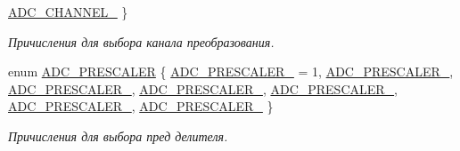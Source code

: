 \begin{DoxyCompactItemize}
\mbox{\hyperlink{group___a_d_c_ggaecdfe48b0bc36d2dd1f99274613a6c92ad6ef86ca1b448f220905d771f258586a}{A\+D\+C\+\_\+\+C\+H\+A\+N\+N\+E\+L\+\_}}
 \}
\begin{DoxyCompactList}\small\item\em Причисления для выбора канала преобразования. \end{DoxyCompactList}\item 
enum \mbox{\hyperlink{group___a_d_c_gaed8f948440ecdc58f0e7139db60e8e8e}{A\+D\+C\+\_\+\+P\+R\+E\+S\+C\+A\+L\+ER}} \{ \newline
\mbox{\hyperlink{group___a_d_c_ggaed8f948440ecdc58f0e7139db60e8e8ea48252a906c632fcb42242633ffe6a40a}{A\+D\+C\+\_\+\+P\+R\+E\+S\+C\+A\+L\+E\+R\+\_}} = 1, 
\mbox{\hyperlink{group___a_d_c_ggaed8f948440ecdc58f0e7139db60e8e8ea9748302262a80c1cdb3bd245535fb3a1}{A\+D\+C\+\_\+\+P\+R\+E\+S\+C\+A\+L\+E\+R\+\_}}, 
\mbox{\hyperlink{group___a_d_c_ggaed8f948440ecdc58f0e7139db60e8e8eae14acc5684c99eb21c9812b2166071b3}{A\+D\+C\+\_\+\+P\+R\+E\+S\+C\+A\+L\+E\+R\+\_}}, 
\mbox{\hyperlink{group___a_d_c_ggaed8f948440ecdc58f0e7139db60e8e8ea8f37b7469c09fd96dde8aac7d5e6b92a}{A\+D\+C\+\_\+\+P\+R\+E\+S\+C\+A\+L\+E\+R\+\_}}, 
\newline
\mbox{\hyperlink{group___a_d_c_ggaed8f948440ecdc58f0e7139db60e8e8ea2b3edc83722c3d3763b2bba0b26aa867}{A\+D\+C\+\_\+\+P\+R\+E\+S\+C\+A\+L\+E\+R\+\_}}, 
\mbox{\hyperlink{group___a_d_c_ggaed8f948440ecdc58f0e7139db60e8e8ea090eaf9d6262f32bfd23214b4e180216}{A\+D\+C\+\_\+\+P\+R\+E\+S\+C\+A\+L\+E\+R\+\_}}, 
\mbox{\hyperlink{group___a_d_c_ggaed8f948440ecdc58f0e7139db60e8e8ea69cfa0fc0ce969c362d2846a1ec38913}{A\+D\+C\+\_\+\+P\+R\+E\+S\+C\+A\+L\+E\+R\+\_}}
 \}
\begin{DoxyCompactList}\small\item\em Причисления для выбора пред делителя. \end{DoxyCompactList}\end{DoxyCompactItemize}
